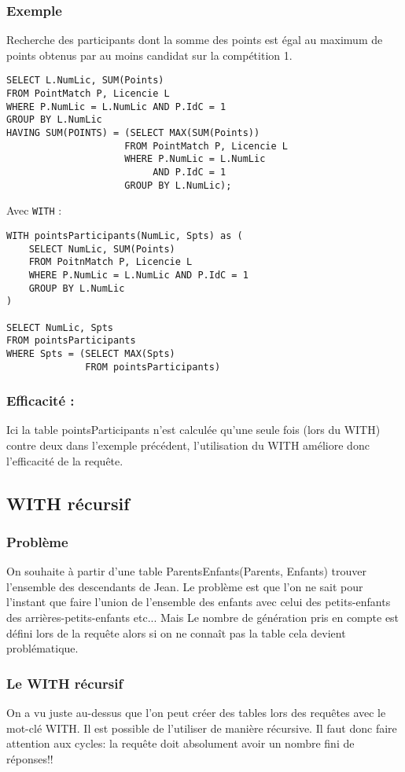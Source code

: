 \documentclass[10pt,a4paper,twoside]{article}
\begin{document}
\subsubsection{Exemple} 
Recherche des participants dont la somme des points est égal au maximum de points obtenus par au moins candidat sur la compétition 1.
\begin{verbatim}
SELECT L.NumLic, SUM(Points)
FROM PointMatch P, Licencie L
WHERE P.NumLic = L.NumLic AND P.IdC = 1
GROUP BY L.NumLic
HAVING SUM(POINTS) = (SELECT MAX(SUM(Points))
                     FROM PointMatch P, Licencie L
                     WHERE P.NumLic = L.NumLic
                          AND P.IdC = 1
                     GROUP BY L.NumLic);
\end{verbatim}
Avec \verb=WITH= :
\begin{verbatim}
WITH pointsParticipants(NumLic, Spts) as (
    SELECT NumLic, SUM(Points)
    FROM PoitnMatch P, Licencie L
    WHERE P.NumLic = L.NumLic AND P.IdC = 1
    GROUP BY L.NumLic
)

SELECT NumLic, Spts
FROM pointsParticipants
WHERE Spts = (SELECT MAX(Spts)
              FROM pointsParticipants)
\end{verbatim}

\subsubsection{Efficacité :} 
Ici la table pointsParticipants n'est calculée qu'une seule fois (lors du WITH) contre deux dans l'exemple précédent, l'utilisation du WITH améliore donc l'efficacité de la requête.

\subsection{WITH récursif}
\subsubsection{Problème} 
On souhaite à partir d'une table ParentsEnfants(Parents, Enfants) trouver l'ensemble des descendants de Jean. Le problème est que l'on ne sait pour l'instant que faire l'union de l'ensemble des enfants avec celui des petits-enfants des arrières-petits-enfants etc... Mais Le nombre de génération pris en compte est défini lors de la requête alors si on ne connaît pas la table cela devient problématique.

\subsubsection{Le WITH récursif} 
On a vu juste au-dessus que l'on peut créer des tables lors des requêtes avec le mot-clé WITH. Il est possible de l'utiliser de manière récursive. Il faut donc faire attention aux cycles: la requête doit absolument avoir un nombre fini de réponses!!
\end{document}
